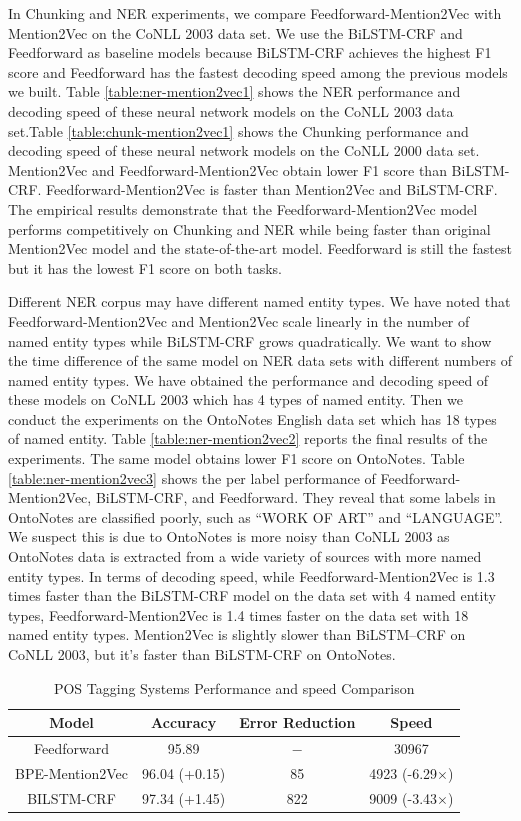 In Chunking and NER experiments, we compare Feedforward-Mention2Vec with Mention2Vec on the CoNLL 2003 data set. We use the BiLSTM-CRF and Feedforward as baseline models because BiLSTM-CRF achieves the highest F1 score and Feedforward has the fastest decoding speed among the previous models we built. Table \ref{table:ner-mention2vec1} shows the NER performance and decoding speed of these neural network models on the CoNLL 2003 data set.Table \ref{table:chunk-mention2vec1} shows the Chunking performance and decoding speed of these neural network models on the CoNLL 2000 data set. Mention2Vec and Feedforward-Mention2Vec obtain lower F1 score than BiLSTM-CRF. Feedforward-Mention2Vec is faster than Mention2Vec and BiLSTM-CRF. The empirical results demonstrate that the Feedforward-Mention2Vec model performs competitively on Chunking and NER while being faster than original Mention2Vec model and the state-of-the-art model. Feedforward is still the fastest but it has the lowest F1 score on both tasks.

Different NER corpus may have different named entity types. We have noted that Feedforward-Mention2Vec and Mention2Vec scale linearly in the number of named entity types while BiLSTM-CRF grows quadratically. We want to show the time difference of the same model on NER data sets with different numbers of named entity types. We have obtained the performance and decoding speed of these models on CoNLL 2003 which has 4 types of named entity. Then we conduct the experiments on the OntoNotes English data set which has 18 types of named entity. Table \ref{table:ner-mention2vec2} reports the final results of the experiments. The same model obtains lower F1 score on OntoNotes. Table \ref{table:ner-mention2vec3} shows the per label performance of Feedforward-Mention2Vec, BiLSTM-CRF, and Feedforward. They reveal that some labels in OntoNotes are classified poorly, such as ``WORK OF ART'' and ``LANGUAGE''. We suspect this is due to OntoNotes is more noisy than CoNLL 2003 as OntoNotes data is extracted from a wide variety of sources with more named entity types. In terms of decoding speed, while Feedforward-Mention2Vec is 1.3 times faster than the BiLSTM-CRF model on the data set with 4 named entity types, Feedforward-Mention2Vec is 1.4 times faster on the data set with 18 named entity types. Mention2Vec is slightly slower than BiLSTM--CRF on CoNLL 2003, but it's faster than BiLSTM-CRF on OntoNotes.

\begin{table}[h]
\centering
\caption{POS Tagging Systems Performance and speed Comparison}
\label{table:pos-mention2vec}
\begin{tabular}{|c|c|c|c|}
\hline
Model   & Accuracy & Error Reduction & Speed \\ \hline
Feedforward     & 95.89  & $-$ & 30967  \\ \hline
BPE-Mention2Vec & 96.04 (+0.15) &85 & 4923 (-6.29$\times$)   \\ \hline
BILSTM-CRF & 97.34 (+1.45) &822 & 9009 (-3.43$\times$) \\ \hline
\end{tabular}
\end{table}

